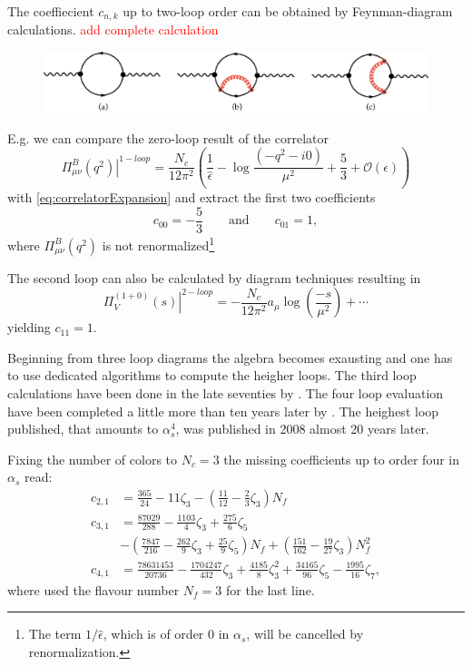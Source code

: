 \documentclass[../../index.tex]{subfiles}
\begin{document}
The coeffiecient $c_{n,k}$ up to two-loop order can be
obtained by Feynman-diagram calculations.
\textcolor{red}{add complete calculation}
\begin{figure}
  \centering
  \includegraphics[width=\textwidth]{./images/correlatorLoopDiagrams.eps}
\end{figure}
E.g. we can compare the zero-loop result of the correlator \cite{Jamin2006}
\begin{equation}
  \left. \Pi^B_{\mu\nu}(q^2) \right\rvert^{1-loop} = \frac{N_c}{12\pi^2} \left( \frac{1}{\hat \epsilon} - \log\frac{(-q^2 - i0)}{\mu^2} + \frac{5}{3} + \mathcal{O}(\epsilon) \right)
\end{equation}
with \cref{eq:correlatorExpansion} and extract the first two coefficients 
\begin{equation}
  c_{00} = - \frac{5}{3} \qquad \text{and} \qquad c_{01} = 1,
\end{equation}
where $\Pi^B_{\mu\nu}(q^2)$ is not renormalized\footnote{The term $1/ \hat
  \epsilon$, which is of order 0 in $\alpha_s$, will be cancelled by renormalization.}

The second loop can also be calculated by diagram techniques resulting in \cite{Boito2011}
\begin{equation}
  \left. \Pi_V^{(1+0)}(s) \right\rvert^{2-loop} = -\frac{N_c}{12\pi^2} a_\mu \log(\frac{-s}{\mu^2}) + \cdots
\end{equation}
yielding  $c_{11} = 1$.

Beginning from three loop diagrams the algebra becomes exausting and one has to
use dedicated algorithms to compute the heigher loops. The third loop
calculations have been done in the late seventies by
\cite{Chetyrkin1979,Dine1979,Celmaster1979}. The four loop evaluation have been
completed a little more than ten years later by
\cite{Gorishnii1990,Surguladze1990}. The heighest loop published, that amounts
to $\alpha_s^4$, was published in 2008 \cite{Baikov2008} almost 20 years later.

Fixing the number of colors to $N_c=3$ the missing coefficients up to order four
in $\alpha_s$ read:
\begin{equation}
  \label{eq:adlerCoefficients}
  \begin{split}
    c_{2,1} &= \frac{365}{24} - 11 \zeta_3 - \left( \frac{11}{12} - \frac{2}{3}\zeta_3 \right) N_f \\ 
    c_{3,1} &= \frac{87029}{288} - \frac{1103}{4} \zeta_3 + \frac{275}{6}\zeta_5 \\
           &- \left( \frac{7847}{216} - \frac{262}{9} \zeta_3 + \frac{25}{9} \zeta_5 \right) N_f + \left( \frac{151}{162} - \frac{19}{27}\zeta_3\right)N_f^2 \\
   c_{4,1} &= \frac{78631453}{20736} - \frac{1704247}{432}\zeta_3 + \frac{4185}{8}\zeta_3^2 + \frac{34165}{96}\zeta_5 - \frac{1995}{16}\zeta_7,
  \end{split}
\end{equation}
where used the flavour number $N_f=3$ for the last line.
\end{document}
